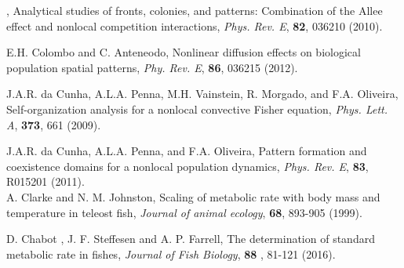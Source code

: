 \documentclass[10pt]{iopart}
\begin{document}
\begin{thebibliography}{100}
{, {Analytical studies of fronts, colonies, and patterns: Combination of the Allee effect and nonlocal competition interactions}, \textit{Phys. Rev. E}, \textbf{82}, {036210} {(2010)}.

 {E.H. Colombo and C. Anteneodo}, {Nonlinear diffusion effects on biological population spatial patterns},  \textit{Phy. Rev. E}, \textbf{86}, 036215 (2012). 

 {J.A.R. da Cunha, A.L.A. Penna, M.H. Vainstein, R. Morgado, and F.A. Oliveira}, {Self-organization analysis for a nonlocal convective Fisher equation}, \textit{Phys. Lett. A}, \textbf{373}, 661 {(2009)}.

 {J.A.R. da Cunha, A.L.A. Penna, and F.A. Oliveira}, {Pattern formation and coexistence domains for a nonlocal population dynamics}, \textit{Phys. Rev. E}, \textbf{83}, {R015201} {(2011)}.\\

 { A. Clarke and  N. M. Johnston}, {Scaling of metabolic rate with body mass and temperature in teleost fish}, \textit{Journal of animal ecology}, \textbf{68},  893-905 (1999).}

 {D. Chabot , J. F. Steffesen and A. P. Farrell}, {The determination of standard metabolic rate in fishes}, \textit{Journal of Fish Biology}, \textbf{88} , 81-121 (2016).

\end{thebibliography}
\end{document}
